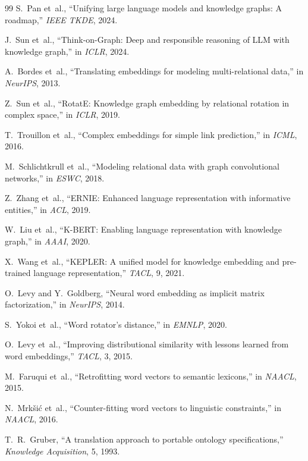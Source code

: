 \documentclass[conference]{IEEEtran}
\begin{document}
\begin{thebibliography}{99}
S.~Pan et~al., ``Unifying large language models and knowledge graphs: A roadmap,'' \emph{IEEE TKDE}, 2024.

J.~Sun et~al., ``Think-on-Graph: Deep and responsible reasoning of LLM with knowledge graph,'' in \emph{ICLR}, 2024.

A.~Bordes et~al., ``Translating embeddings for modeling multi-relational data,'' in \emph{NeurIPS}, 2013.

Z.~Sun et~al., ``RotatE: Knowledge graph embedding by relational rotation in complex space,'' in \emph{ICLR}, 2019.

T.~Trouillon et~al., ``Complex embeddings for simple link prediction,'' in \emph{ICML}, 2016.

M.~Schlichtkrull et~al., ``Modeling relational data with graph convolutional networks,'' in \emph{ESWC}, 2018.

Z.~Zhang et~al., ``ERNIE: Enhanced language representation with informative entities,'' in \emph{ACL}, 2019.

W.~Liu et~al., ``K-BERT: Enabling language representation with knowledge graph,'' in \emph{AAAI}, 2020.

X.~Wang et~al., ``KEPLER: A unified model for knowledge embedding and pre-trained language representation,'' \emph{TACL}, 9, 2021.

O.~Levy and Y.~Goldberg, ``Neural word embedding as implicit matrix factorization,'' in \emph{NeurIPS}, 2014.

S.~Yokoi et~al., ``Word rotator's distance,'' in \emph{EMNLP}, 2020.

O.~Levy et~al., ``Improving distributional similarity with lessons learned from word embeddings,'' \emph{TACL}, 3, 2015.

M.~Faruqui et~al., ``Retrofitting word vectors to semantic lexicons,'' in \emph{NAACL}, 2015.

N.~Mrk{\v{s}}i{\'c} et~al., ``Counter-fitting word vectors to linguistic constraints,'' in \emph{NAACL}, 2016.

T.~R.~Gruber, ``A translation approach to portable ontology specifications,'' \emph{Knowledge Acquisition}, 5, 1993.


\end{thebibliography}
\end{document}
